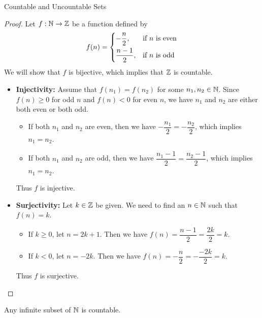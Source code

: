 \begin{section}{Countable and Uncountable Sets}
\begin{proof}
    Let $f: \mathbb{N} \to \mathbb{Z}$ be a function defined by
    \[
    f(n) = \begin{dcases}
        - \frac{n}{2}, & \text{if } n \text{ is even} \\
        \frac{n - 1}{2}, & \text{if } n \text{ is odd}
    \end{dcases}
    \]
    We will show that $f$ is bijective, which implies that $\mathbb{Z}$ is countable.
    \begin{itemize}
        \item \textbf{Injectivity:} Assume that $f(n_1) = f(n_2)$ for some $n_1, n_2 \in \mathbb{N}$. Since $f(n) \geq 0$
        for odd $n$ and $f(n) < 0$ for even $n$, we have $n_1$ and $n_2$ are either both even or both odd.
            \begin{itemize}
                \item If both $n_1$ and $n_2$ are even, then we have $- \dfrac{n_1}{2} = - \dfrac{n_2}{2}$,
                which implies $n_1 = n_2$.
                \item If both $n_1$ and $n_2$ are odd, then we have $\dfrac{n_1 - 1}{2} = \dfrac{n_2 - 1}{2}$,
                which implies $n_1 = n_2$.
            \end{itemize}
            Thus $f$ is injective.
        \item \textbf{Surjectivity:} Let $k \in \mathbb{Z}$ be given. We need to find an $n \in \mathbb{N}$ such that $f(n) = k$.
            \begin{itemize}
                \item If $k \geq 0$, let $n = 2k + 1$. Then we have $f(n) = \dfrac{n - 1}{2} = \dfrac{2k}{2} = k$.
                \item If $k < 0$, let $n = -2k$. Then we have $f(n) = - \dfrac{n}{2} = - \dfrac{-2k}{2} = k$.
            \end{itemize}
            Thus $f$ is surjective.
    \end{itemize}
\end{proof}

\bigskip

\begin{lemma} \label{lem:InfiniteSubsetOfNIsCountable}
    Any infinite subset of $\mathbb{N}$ is countable.
\end{lemma}


\end{section}
